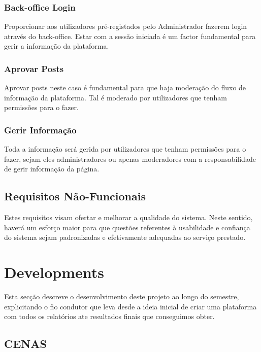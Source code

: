 \documentclass[a4paper,12pt,journal,twoside,compsoc]{PPIEEEtran}
\begin{document}
\subsubsection{Back-office Login}

Proporcionar aos utilizadores pré-registados pelo Administrador fazerem login através do back-office. Estar com a sessão iniciada é um factor fundamental para gerir a informação da plataforma.

\subsubsection{Aprovar Posts}

Aprovar posts neste caso é fundamental para que haja moderação do fluxo de informação da plataforma. Tal é moderado por utilizadores que tenham permissões para o fazer.

\subsubsection{Gerir Informação}

Toda a informação será gerida por utilizadores que tenham permissões para o fazer, sejam eles administradores ou apenas moderadores com a responsabilidade de gerir informação da página.

\subsection{Requisitos Não-Funcionais}

Estes requisitos visam ofertar e melhorar a qualidade do sistema. Neste sentido, haverá um esforço maior para que questões referentes à usabilidade e confiança do sistema sejam padronizadas e efetivamente adequadas ao serviço prestado.


\section{Developments}

Esta secção descreve o desenvolvimento deste projeto ao longo do semestre, explicitando o fio condutor que leva desde a ideia inicial de criar uma plataforma com todos os relatórios ate resultados finais que conseguimos obter.

\subsection{CENAS}
\end{document}
